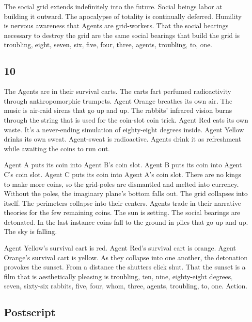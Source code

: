 The social grid extends indefinitely into the future. Social beings
labor at building it outward. The apocalypse of totality is continually
deferred. Humility is nervous awareness that Agents are grid-workers.
That the social bearings necessary to destroy the grid are the same
social bearings that build the grid is troubling, eight, seven, six,
five, four, three, agents, troubling, to, one.

\hypertarget{section-11}{%
\subsection{10}\label{section-11}}

The Agents are in their survival carts. The carts fart perfumed
radioactivity through anthropomorphic trumpets. Agent Orange breathes
its own air. The music is air-raid sirens that go up and up. The
rabbits' infrared vision burns through the string that is used for the
coin-slot coin trick. Agent Red eats its own waste. It's a never-ending
simulation of eighty-eight degrees inside. Agent Yellow drinks its own
sweat. Agent-sweat is radioactive. Agents drink it as refreshment while
awaiting the coins to run out.

Agent A puts its coin into Agent B's coin slot. Agent B puts its coin
into Agent C's coin slot. Agent C puts its coin into Agent A's coin
slot. There are no kings to make more coins, so the grid-poles are
dismantled and melted into currency. Without the poles, the imaginary
plane's bottom falls out. The grid collapses into itself. The perimeters
collapse into their centers. Agents trade in their narrative theories
for the few remaining coins. The sun is setting. The social bearings are
detonated. In the last instance coins fall to the ground in piles that
go up and up. The sky is falling.

Agent Yellow's survival cart is red. Agent Red's survival cart is
orange. Agent Orange's survival cart is yellow. As they collapse into
one another, the detonation provokes the sunset. From a distance the
shutters click shut. That the sunset is a film that is aesthetically
pleasing is troubling, ten, nine, eighty-eight degrees, seven, sixty-six
rabbits, five, four, whom, three, agents, troubling, to, one. Action.

\hypertarget{postscript}{%
\subsection{Postscript}\label{postscript}}

